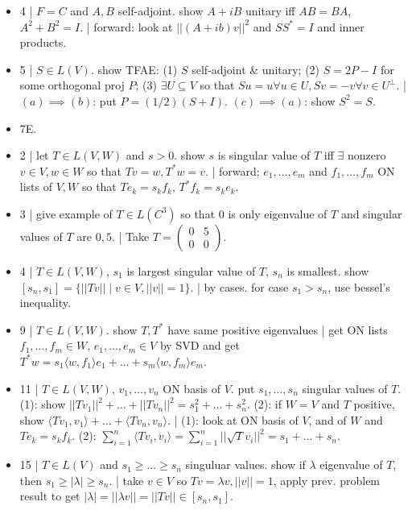 \begin{itemize}
	\item 4 | $F=C$ and $A,B$ self-adjoint. show $A+iB$ unitary iff $AB=BA$, $A^2 + B^2 = I$. | forward: look at $||(A+ib)v||^2$ and $SS^*=I$ and inner products. 
	\item 5 | $S \in L(V)$. show TFAE: (1) $S$ self-adjoint \& unitary; (2) $S=2P-I$ for some orthogonal proj $P$; (3) $\exists U \subseteq V$ so that $Su=u \forall u \in U, Sv=-v \forall v \in U^\perp$. | $(a) \implies (b)$: put $P=(1/2)(S+I)$. $(c) \implies (a)$: show $S^2 = S$. 
	\item 7E. 
	\item 2 | let $T \in L(V,W)$ and $s>0$. show $s$ is singular value of $T$ iff $\exists$ nonzero $v \in V, w \in W$ so that $Tv=w, T^*w=v$. | forward; $e_1,\dots,e_m$ and $f_1,\dots,f_m$ ON lists of $V,W$ so that $Te_k = s_kf_k$, $T^*f_k = s_ke_k$. 
	\item 3 | give example of $T \in L(C^3)$ so that 0 is only eigenvalue of $T$ and singular values of $T$ are $0,5$. | Take $T = \begin{pmatrix} 0 & 5 \\ 0 & 0 \end{pmatrix}$. 
	\item 4 | $T \in L(V,W)$, $s_1$ is largest singular value of $T$, $s_n$ is smallest. show $[s_n,s_1] = \{||Tv|| \mid v \in V, ||v||=1\}$. | by cases. for case $s_1>s_n$, use bessel's inequality. 
	\item 9 | $T \in L(V,W)$. show $T,T^*$ have same positive eigenvalues | get ON lists $f_1,\dots,f_m \in W$, $e_1,\dots,e_m \in V$ by SVD and get $T^*w = s_1 \langle w,f_1 \rangle e_1 + \dots + s_m \langle w,f_m \rangle e_m$. 
	\item 11 | $T \in L(V,W)$, $v_1,\dots,v_n$ ON basis of $V$. put $s_1,\dots,s_n$ singular values of $T$. (1): show $||Tv_1||^2 + \dots + ||Tv_n||^2 = s_1^2 + \dots + s_n^2$. (2): if $W=V$ and $T$ positive, show $\langle Tv_1,v_1 \rangle + \dots + \langle Tv_n,v_n \rangle$. | (1): look at ON basis of $V$, and of $W$ and $Te_k = s_kf_k$. (2): $\sum_{i=1}^{n} \langle Tv_i,v_i \rangle = \sum_{i=1}^{n} ||\sqrt{T}v_i||^2 = s_1 + \dots + s_n$. 
	\item 15 | $T \in L(V)$ and $s_1 \geq \dots \geq s_n$ singuluar values. show if $\lambda$ eigenvalue of $T$, then $s_1 \geq |\lambda| \geq s_n$. | take $v \in V$ so $Tv = \lambda v, ||v||=1$, apply prev. problem result to get $|\lambda| = ||\lambda v|| = ||Tv|| \in [s_n,s_1]$. 
\end{itemize}


